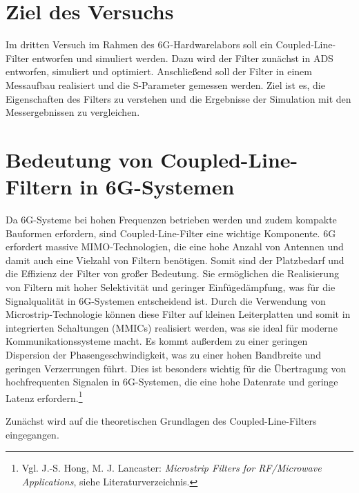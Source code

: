 \section{Ziel des Versuchs}
Im dritten Versuch im Rahmen des 6G-Hardwarelabors soll ein Coupled-Line-Filter entworfen und simuliert werden. Dazu wird der Filter zunächst in ADS entworfen, simuliert und optimiert. 
Anschließend soll der Filter in einem Messaufbau realisiert und die S-Parameter gemessen werden. Ziel ist es, die Eigenschaften des Filters zu verstehen und die Ergebnisse der Simulation mit den Messergebnissen zu vergleichen.

\section{Bedeutung von Coupled-Line-Filtern in 6G-Systemen}
Da 6G-Systeme bei hohen Frequenzen betrieben werden und zudem kompakte Bauformen erfordern, sind Coupled-Line-Filter eine wichtige Komponente. 6G erfordert massive MIMO-Technologien, die eine hohe Anzahl von Antennen und damit auch eine Vielzahl von Filtern benötigen.
Somit sind der Platzbedarf und die Effizienz der Filter von großer Bedeutung.
Sie ermöglichen die Realisierung von Filtern mit hoher Selektivität und geringer Einfügedämpfung, was für die Signalqualität in 6G-Systemen entscheidend ist.
Durch die Verwendung von Microstrip-Technologie können diese Filter auf kleinen Leiterplatten und somit in integrierten Schaltungen (MMICs) realisiert werden, was sie ideal für moderne Kommunikationssysteme macht. Es kommt außerdem zu einer geringen Dispersion der Phasengeschwindigkeit, was zu einer hohen Bandbreite und geringen Verzerrungen führt. Dies ist besonders wichtig für die Übertragung von hochfrequenten Signalen in 6G-Systemen, die eine hohe Datenrate und geringe Latenz erfordern.\footnote{Vgl. J.-S. Hong, M. J. Lancaster: \textit{Microstrip Filters for RF/Microwave Applications}, siehe Literaturverzeichnis.}

Zunächst wird auf die theoretischen Grundlagen des Coupled-Line-Filters eingegangen.


\clearpage